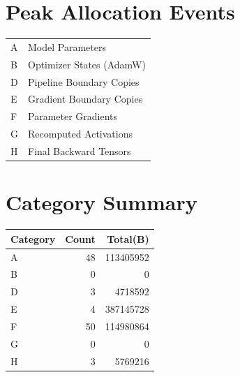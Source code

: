 \documentclass{article}
\begin{document}
\section*{Peak Allocation Events}
\small
\begin{tabular}{ll}
A & Model Parameters \\
B & Optimizer States (AdamW) \\
D & Pipeline Boundary Copies \\
E & Gradient Boundary Copies \\
F & Parameter Gradients \\
G & Recomputed Activations \\
H & Final Backward Tensors \\
\end{tabular}
\vspace{0.5em}
\section*{Category Summary}
\begin{tabular}{l r r}
Category & Count & Total(B) \\
\hline
A & 48 & 113405952 \\
B & 0 & 0 \\
D & 3 & 4718592 \\
E & 4 & 387145728 \\
F & 50 & 114980864 \\
G & 0 & 0 \\
H & 3 & 5769216 \\
\end{tabular}
\vspace{0.5em}
\end{document}
